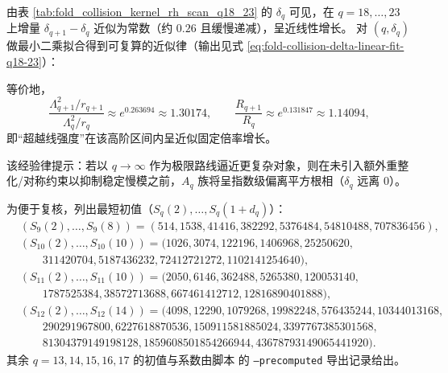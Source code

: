 

\begin{remark}[高阶 \texorpdfstring{$\delta_q$}{deltaq} 的近线性律（\(q=18,\dots,23\)）]\label{rem:pom-collision-kernel-rh-linear}
由表 \ref{tab:fold_collision_kernel_rh_scan_q18_23} 的 \(\delta_q\) 可见，在 \(q=18,\dots,23\) 上增量
\(\delta_{q+1}-\delta_q\) 近似为常数（约 \(0.26\) 且缓慢递减），呈近线性增长。
对 \((q,\delta_q)\) 做最小二乘拟合得到可复算的近似律（输出见式 \eqref{eq:fold-collision-delta-linear-fit-q18-23}）：

等价地，
\[
\frac{\Lambda_{q+1}^2/r_{q+1}}{\Lambda_q^2/r_q}\approx e^{0.263694}\approx 1.30174,
\qquad
\frac{R_{q+1}}{R_q}\approx e^{0.131847}\approx 1.14094,
\]
即“超越线强度”在该高阶区间内呈近似固定倍率增长。
\par
该经验律提示：若以 \(q\to\infty\) 作为极限路线逼近更复杂对象，则在未引入额外重整化/对称约束以抑制稳定慢模之前，\(A_q\) 族将呈指数级偏离平方根相（\(\delta_q\) 远离 \(0\)）。
\end{remark}



\begin{remark}[高阶递推的最短初值（\(q=9,10,11,12\)）]\label{rem:pom-moment-init-9-12}
为便于复核，列出最短初值（\(S_q(2),\dots,S_q(1+d_q)\)）：
$$
\begin{aligned}
&(S_9(2),\dots,S_9(8))=(514,1538,41416,382292,5376484,54810488,707836456),\\
&(S_{10}(2),\dots,S_{10}(10))=(1026,3074,122196,1406968,25250620,\\
&\qquad 311420704,5187436232,72412721272,1102141254640),\\
&(S_{11}(2),\dots,S_{11}(10))=(2050,6146,362488,5265380,120053140,\\
&\qquad 1787525384,38572713688,667461412712,12816890401888),\\
&(S_{12}(2),\dots,S_{12}(14))=(4098,12290,1079268,19982248,576435244,10344013168,\\
&\qquad 290291967800,6227618870536,150911581885024,3397767385301568,\\
&\qquad 81304379149198128,1859608501854266944,43678793149065441920).
\end{aligned}
$$
其余 \(q=13,14,15,16,17\) 的初值与系数由脚本  的 \texttt{--precomputed} 导出记录给出。
\end{remark}

